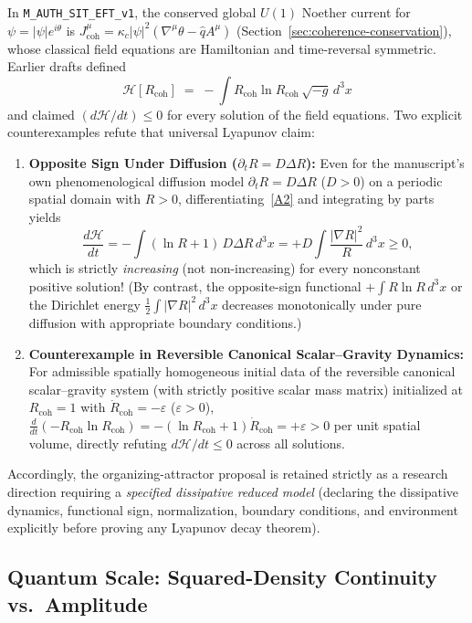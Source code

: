 In \texttt{M\_AUTH\_SIT\_EFT\_v1}, the conserved global $U(1)$ Noether current for $\psi = |\psi|e^{i\theta}$ is $J^\mu_{\mathrm{coh}} = \kappa_c|\psi|^2(\nabla^\mu\theta - \hat{q}A^\mu)$ (Section~\ref{sec:coherence-conservation}), whose classical field equations are Hamiltonian and time-reversal symmetric. Earlier drafts defined
\begin{equation}
\mathcal{H}[R_{\mathrm{coh}}]
   \;=\;
   -\!\int R_{\mathrm{coh}}\ln R_{\mathrm{coh}}\,
          \sqrt{-g}\,d^{3}x
\tag{A2}\label{A2}
\end{equation}
and claimed $(d\mathcal{H}/dt) \le 0$ for every solution of the field equations. Two explicit counterexamples refute that universal Lyapunov claim:
\begin{enumerate}[leftmargin=2em]
  \item \textbf{Opposite Sign Under Diffusion ($\partial_t R = D\Delta R$):} Even for the manuscript's own phenomenological diffusion model $\partial_t R = D\Delta R$ ($D > 0$) on a periodic spatial domain with $R > 0$, differentiating~\eqref{A2} and integrating by parts yields
  \[
  \frac{d\mathcal{H}}{dt}
  = -\int (\ln R + 1)\,D\Delta R\,d^3x
  = +D\int \frac{|\nabla R|^2}{R}\,d^3x \ge 0,
  \]
  which is strictly \emph{increasing} (not non-increasing) for every nonconstant positive solution! (By contrast, the opposite-sign functional $+\int R\ln R\,d^3x$ or the Dirichlet energy $\frac{1}{2}\int|\nabla R|^2\,d^3x$ decreases monotonically under pure diffusion with appropriate boundary conditions.)
  \item \textbf{Counterexample in Reversible Canonical Scalar--Gravity Dynamics:} For admissible spatially homogeneous initial data of the reversible canonical scalar--gravity system (with strictly positive scalar mass matrix) initialized at $R_{\mathrm{coh}} = 1$ with $\dot{R}_{\mathrm{coh}} = -\varepsilon$ ($\varepsilon > 0$), $\frac{d}{dt}(-R_{\mathrm{coh}}\ln R_{\mathrm{coh}}) = -(\ln R_{\mathrm{coh}} + 1)\dot{R}_{\mathrm{coh}} = +\varepsilon > 0$ per unit spatial volume, directly refuting $d\mathcal{H}/dt \le 0$ across all solutions.
\end{enumerate}
Accordingly, the organizing-attractor proposal is retained strictly as a research direction requiring a \emph{specified dissipative reduced model} (declaring the dissipative dynamics, functional sign, normalization, boundary conditions, and environment explicitly before proving any Lyapunov decay theorem).

\subsection{Quantum Scale: Squared-Density Continuity vs.\ Amplitude}

